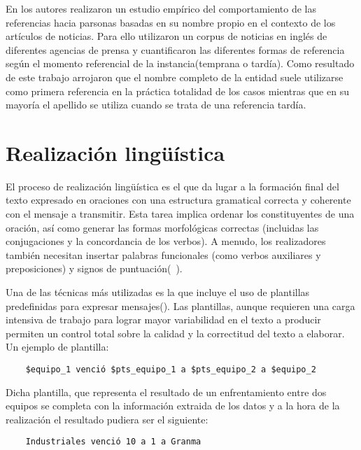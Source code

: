     En \cite{siddharthan2011information} los autores realizaron un estudio emp\'irico del comportamiento de las referencias hacia parsonas basadas en 
su nombre propio en el contexto de los art\'iculos de noticias. Para ello utilizaron un corpus de noticias en inglés de diferentes agencias de prensa y 
cuantificaron las diferentes formas de referencia seg\'un el momento referencial de la instancia(temprana o tard\'ia). Como resultado de este trabajo 
arrojaron que el nombre completo de la entidad suele utilizarse como primera referencia en la pr\'actica totalidad de los casos mientras que en su mayor\'ia
el apellido se utiliza cuando se trata de una referencia tard\'ia. 


\section{Realización lingüística}

    El proceso de realizaci\'on lingüística es el que da lugar a la formaci\'on final del texto expresado en oraciones con una 
estructura gramatical correcta y coherente con el mensaje a transmitir. Esta tarea implica ordenar los constituyentes de una oración, 
así como generar las formas morfológicas correctas (incluidas las conjugaciones y la concordancia de los verbos). A menudo, los 
realizadores también necesitan insertar palabras funcionales (como verbos auxiliares y preposiciones) y signos de puntuación(~\cite{Gatt2018SurveyOT}).
   
    Una de las t\'ecnicas m\'as utilizadas es la que incluye el uso de plantillas predefinidas para expresar mensajes(\cite{Gatt2018SurveyOT}). Las 
plantillas, aunque requieren una carga intensiva de trabajo para lograr mayor variabilidad en el texto a producir permiten un control total sobre 
la calidad y la correctitud del texto a elaborar. Un ejemplo de plantilla:

\begin{verbatim}
    $equipo_1 venció $pts_equipo_1 a $pts_equipo_2 a $equipo_2
\end{verbatim}

    Dicha plantilla, que representa el resultado de un enfrentamiento entre dos equipos se completa con la información extraida de los datos y a la hora de 
la realización el resultado pudiera ser el siguiente:

\begin{verbatim}
    Industriales venció 10 a 1 a Granma
\end{verbatim}


